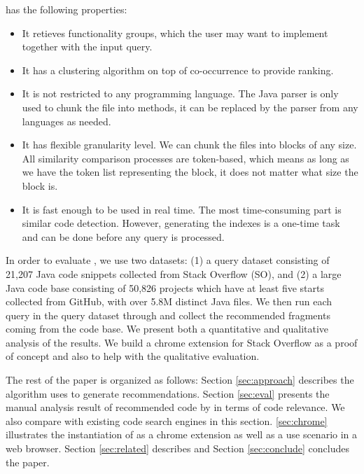 {\tool} has the following properties:
\begin{itemize}
	\item It retieves functionality groups, which the user may want to implement together with the input query.
	\item It has a clustering algorithm on top of co-occurrence to provide ranking.
	\item It is not restricted to any programming language. The Java parser is only used to chunk the file into methods, it can be replaced by the parser from any languages as needed.
	\item It has flexible granularity level. We can chunk the files into blocks of any size. All similarity comparison processes are token-based, which means as long as we have the token list representing the block, it does not matter what size the block is.
	\item It is fast enough to be used in real time. The most
          time-consuming part is similar code detection. However,
          generating the indexes is a one-time task and can be done
          before any query is processed.	
\end{itemize}

In order to evaluate {\tool}, we use two datasets: (1) a query dataset
consisting of 21,207 Java code snippets collected from Stack Overflow
(SO), and (2) a large Java code base consisting of 50,826 projects which 
have at least five starts collected from GitHub, with over 5.8M distinct 
Java files. We then run each query in the query dataset through {\tool} 
and collect the recommended fragments coming from the code base. 
We present both a quantitative and qualitative analysis of the results.
We build a chrome extension for Stack Overflow as a proof of concept and also to help with the qualitative evaluation.

The rest of the paper is organized as follows: Section
\ref{sec:approach} describes the algorithm {\tool} uses to generate
recommendations. Section \ref{sec:eval} presents the manual analysis result of recommended code by {\tool} in terms of code relevance. We also compare {\tool} with existing code search engines in this section. \ref{sec:chrome} illustrates the instantiation of {\tool} as a chrome extension as well as a use scenario in a web browser. Section \ref{sec:related} describes and Section \ref{sec:conclude} concludes the paper.

